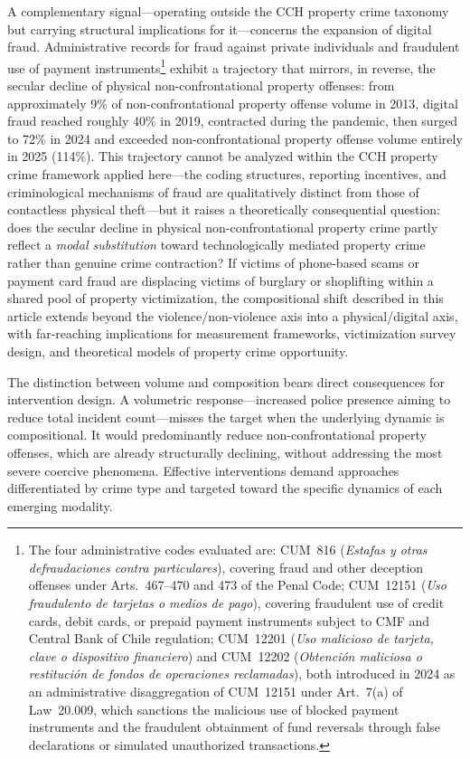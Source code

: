 \documentclass[pdflatex,sn-basic]{sn-jnl}
\begin{document}
A complementary signal---operating outside the CCH property crime taxonomy but carrying structural implications for it---concerns the expansion of digital fraud. Administrative records for fraud against private individuals and fraudulent use of payment instruments\footnote{The four administrative codes evaluated are: CUM~816 (\textit{Estafas y otras defraudaciones contra particulares}), covering fraud and other deception offenses under Arts.~467--470 and 473 of the Penal Code; CUM~12151 (\textit{Uso fraudulento de tarjetas o medios de pago}), covering fraudulent use of credit cards, debit cards, or prepaid payment instruments subject to CMF and Central Bank of Chile regulation; CUM~12201 (\textit{Uso malicioso de tarjeta, clave o dispositivo financiero}) and CUM~12202 (\textit{Obtención maliciosa o restitución de fondos de operaciones reclamadas}), both introduced in 2024 as an administrative disaggregation of CUM~12151 under Art.~7(a) of Law~20.009, which sanctions the malicious use of blocked payment instruments and the fraudulent obtainment of fund reversals through false declarations or simulated unauthorized transactions.} exhibit a trajectory that mirrors, in reverse, the secular decline of physical non-confrontational property offenses: from approximately 9\% of non-confrontational property offense volume in 2013, digital fraud reached roughly 40\% in 2019, contracted during the pandemic, then surged to 72\% in 2024 and exceeded non-confrontational property offense volume entirely in 2025 (114\%). This trajectory cannot be analyzed within the CCH property crime framework applied here---the coding structures, reporting incentives, and criminological mechanisms of fraud are qualitatively distinct from those of contactless physical theft---but it raises a theoretically consequential question: does the secular decline in physical non-confrontational property crime partly reflect a \emph{modal substitution} toward technologically mediated property crime rather than genuine crime contraction? If victims of phone-based scams or payment card fraud are displacing victims of burglary or shoplifting within a shared pool of property victimization, the compositional shift described in this article extends beyond the violence/non-violence axis into a physical/digital axis, with far-reaching implications for measurement frameworks, victimization survey design, and theoretical models of property crime opportunity.

The distinction between volume and composition bears direct consequences for intervention design. A volumetric response---increased police presence aiming to reduce total incident count---misses the target when the underlying dynamic is compositional. It would predominantly reduce non-confrontational property offenses, which are already structurally declining, without addressing the most severe coercive phenomena. Effective interventions demand approaches differentiated by crime type and targeted toward the specific dynamics of each emerging modality.
\end{document}
